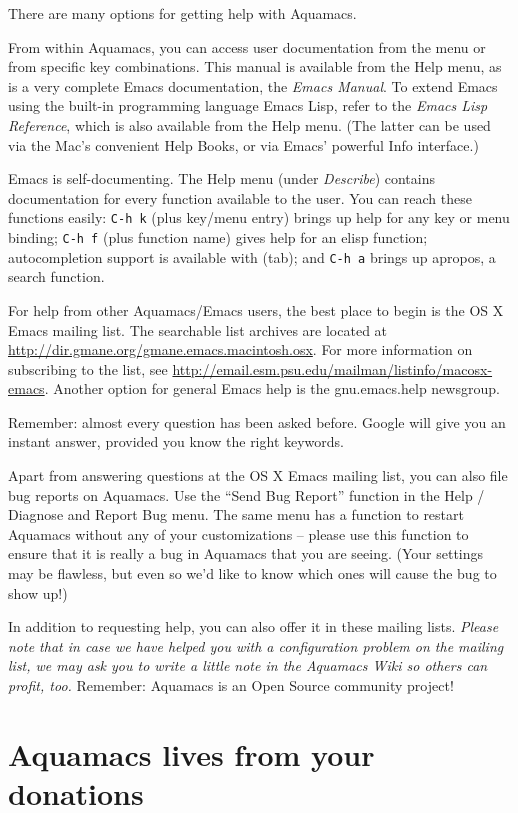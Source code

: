 \documentclass[11pt,letterpaper]{article}
\begin{document}
There are many options for getting help with Aquamacs.

From within Aquamacs, you can access user documentation from the menu or from specific key combinations.  This manual is available from the Help menu, as is a very complete Emacs documentation, the \emph{Emacs Manual}.  To extend Emacs using the built-in programming language Emacs Lisp, refer to the \emph{Emacs Lisp Reference}, which is also available from the Help menu.  (The latter can be used via the Mac's convenient Help Books, or via Emacs' powerful Info interface.)

Emacs is self-documenting.  The Help menu (under \emph{Describe}) contains documentation for every function available to the user.  You can reach these functions easily: {\tt C-h k} (plus key/menu entry) brings up help for any key or menu binding; {\tt C-h f} (plus function name) gives help for an elisp function; autocompletion support is available with (tab); and {\tt C-h a} brings up apropos, a search function.

For help from other Aquamacs/Emacs users, the best place to begin is the OS X Emacs mailing list. The searchable list archives are located at \url{http://dir.gmane.org/gmane.emacs.macintosh.osx}. For more information on subscribing to the list, see \url{http://email.esm.psu.edu/mailman/listinfo/macosx-emacs}.  Another option for general Emacs help is the gnu.emacs.help newsgroup.

Remember: almost every question has been asked before.  Google will give you an instant answer, provided you know the right keywords.

Apart from answering questions at the OS X Emacs mailing list, you can also file bug reports on Aquamacs. Use the ``Send Bug Report'' function in the Help / Diagnose and Report Bug menu.  The same menu has a function to restart Aquamacs without any of your customizations -- please use this function to ensure that it is really a bug in Aquamacs that you are seeing.  (Your settings may be flawless, but even so we'd like to know which ones will cause the bug to show up!)

In addition to requesting help, you can also offer it in these mailing lists. \emph{Please note that in case we have helped you with a configuration problem on the mailing list, we may ask you to write a little note in the Aquamacs Wiki so others can profit, too.} Remember: Aquamacs is an Open Source community project!

\section{Aquamacs lives from your donations}
\end{document}
